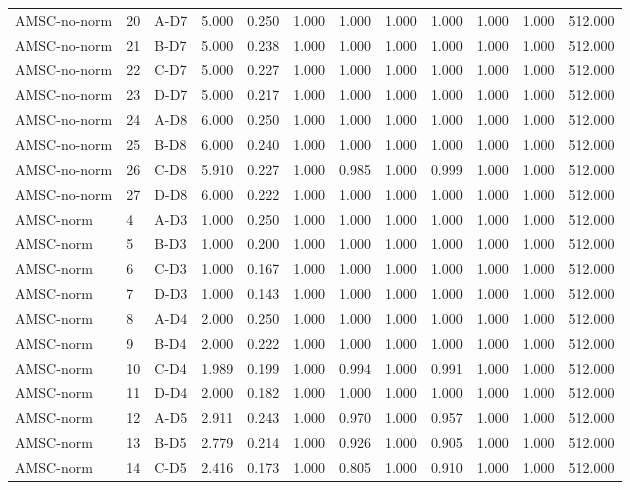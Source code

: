 \begin{table}[ht]
\begin{tabular}{lllrrrrrrrrr}
AMSC-no-norm & 20 & A-D7 & 5.000 & 0.250 & 1.000 & 1.000 & 1.000 & 1.000 & 1.000 & 1.000 & 512.000 \\
AMSC-no-norm & 21 & B-D7 & 5.000 & 0.238 & 1.000 & 1.000 & 1.000 & 1.000 & 1.000 & 1.000 & 512.000 \\
AMSC-no-norm & 22 & C-D7 & 5.000 & 0.227 & 1.000 & 1.000 & 1.000 & 1.000 & 1.000 & 1.000 & 512.000 \\
AMSC-no-norm & 23 & D-D7 & 5.000 & 0.217 & 1.000 & 1.000 & 1.000 & 1.000 & 1.000 & 1.000 & 512.000 \\
AMSC-no-norm & 24 & A-D8 & 6.000 & 0.250 & 1.000 & 1.000 & 1.000 & 1.000 & 1.000 & 1.000 & 512.000 \\
AMSC-no-norm & 25 & B-D8 & 6.000 & 0.240 & 1.000 & 1.000 & 1.000 & 1.000 & 1.000 & 1.000 & 512.000 \\
AMSC-no-norm & 26 & C-D8 & 5.910 & 0.227 & 1.000 & 0.985 & 1.000 & 0.999 & 1.000 & 1.000 & 512.000 \\
AMSC-no-norm & 27 & D-D8 & 6.000 & 0.222 & 1.000 & 1.000 & 1.000 & 1.000 & 1.000 & 1.000 & 512.000 \\
AMSC-norm & 4 & A-D3 & 1.000 & 0.250 & 1.000 & 1.000 & 1.000 & 1.000 & 1.000 & 1.000 & 512.000 \\
AMSC-norm & 5 & B-D3 & 1.000 & 0.200 & 1.000 & 1.000 & 1.000 & 1.000 & 1.000 & 1.000 & 512.000 \\
AMSC-norm & 6 & C-D3 & 1.000 & 0.167 & 1.000 & 1.000 & 1.000 & 1.000 & 1.000 & 1.000 & 512.000 \\
AMSC-norm & 7 & D-D3 & 1.000 & 0.143 & 1.000 & 1.000 & 1.000 & 1.000 & 1.000 & 1.000 & 512.000 \\
AMSC-norm & 8 & A-D4 & 2.000 & 0.250 & 1.000 & 1.000 & 1.000 & 1.000 & 1.000 & 1.000 & 512.000 \\
AMSC-norm & 9 & B-D4 & 2.000 & 0.222 & 1.000 & 1.000 & 1.000 & 1.000 & 1.000 & 1.000 & 512.000 \\
AMSC-norm & 10 & C-D4 & 1.989 & 0.199 & 1.000 & 0.994 & 1.000 & 0.991 & 1.000 & 1.000 & 512.000 \\
AMSC-norm & 11 & D-D4 & 2.000 & 0.182 & 1.000 & 1.000 & 1.000 & 1.000 & 1.000 & 1.000 & 512.000 \\
AMSC-norm & 12 & A-D5 & 2.911 & 0.243 & 1.000 & 0.970 & 1.000 & 0.957 & 1.000 & 1.000 & 512.000 \\
AMSC-norm & 13 & B-D5 & 2.779 & 0.214 & 1.000 & 0.926 & 1.000 & 0.905 & 1.000 & 1.000 & 512.000 \\
AMSC-norm & 14 & C-D5 & 2.416 & 0.173 & 1.000 & 0.805 & 1.000 & 0.910 & 1.000 & 1.000 & 512.000 \\

\end{tabular}
\end{table}
